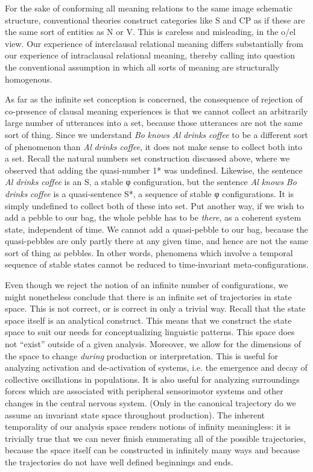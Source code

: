   For the sake of conforming all meaning relations to the same image schematic structure, conventional theories construct categories like S and CP as if these are the same sort of entities as N or V. This is careless and misleading, in the o/el view. Our experience of interclausal relational meaning differs substantially from our experience of intraclausal relational meaning, thereby calling into question the conventional assumption in which all sorts of meaning are structurally homogenous.

  As far as the infinite set conception is concerned, the consequence of rejection of co-presence of clausal meaning experiences is that we cannot collect an arbitrarily large number of utterances into a set, because those utterances are not the same sort of thing. Since we understand \textit{Bo} \textit{knows} \textit{Al} \textit{drinks} \textit{coffee} to be a different sort of phenomenon than \textit{Al} \textit{drinks} \textit{coffee}, it does not make sense to collect both into a set. Recall the natural numbers set construction discussed above, where we observed that adding the quasi-number 1* was undefined. Likewise, the sentence \textit{Al} \textit{drinks} \textit{coffee} is an S, a stable φ configuration, but the sentence \textit{Al} \textit{knows} \textit{Bo} \textit{drinks} \textit{coffee} is a quasi-sentence S*, a sequence of stable φ configurations. It is simply undefined to collect both of these into set. Put another way, if we wish to add a pebble to our bag, the whole pebble has to be \textit{there}, as a coherent system state, independent of time. We cannot add a quasi-pebble to our bag, because the quasi-pebbles are only partly there at any given time, and hence are not the same sort of thing as pebbles. In other words, phenomena which involve a temporal sequence of stable states cannot be reduced to time-invariant meta-configurations.

  Even though we reject the notion of an infinite number of configurations, we might nonetheless conclude that there is an infinite set of trajectories in state space. This is not correct, or is correct in only a trivial way. Recall that the state space itself is an analytical construct. This means that we construct the state space to suit our needs for conceptualizing linguistic patterns. This space does not “exist” outside of a given analysis. Moreover, we allow for the dimensions of the space to change \textit{during} production or interpretation. This is useful for analyzing activation and de-activation of systems, i.e. the emergence and decay of collective oscillations in populations. It is also useful for analyzing surroundings forces which are associated with peripheral sensorimotor systems and other changes in the central nervous system.  (Only in the canonical trajectory do we assume an invariant state space throughout production). The inherent temporality of our analysis space renders notions of infinity meaningless: it is trivially true that we can never finish enumerating all of the possible trajectories, because the space itself can be constructed in infinitely many ways and because the trajectories do not have well defined beginnings and ends.

